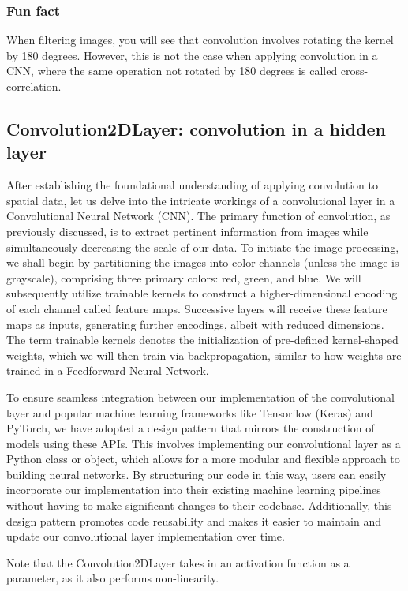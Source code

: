 \documentclass[onecolumn,10pt,cleanfoot]{asme2ej}
\begin{document}
\subsubsection{Fun fact}
When filtering images, you will see that convolution involves rotating the kernel by 180 degrees. However, this is not the case when applying convolution in a CNN, where the same operation not rotated by 180 degrees is called cross-correlation.

\subsection{Convolution2DLayer: convolution in a hidden layer}
After establishing the foundational understanding of applying convolution to spatial data, let us delve into the intricate workings of a convolutional layer in a Convolutional Neural Network (CNN). The primary function of convolution, as previously discussed, is to extract pertinent information from images while simultaneously decreasing the scale of our data. To initiate the image processing, we shall begin by partitioning the images into color channels (unless the image is grayscale), comprising three primary colors: red, green, and blue. We will subsequently utilize trainable kernels to construct a higher-dimensional encoding of each channel called feature maps. Successive layers will receive these feature maps as inputs, generating further encodings, albeit with reduced dimensions. The term trainable kernels denotes the initialization of pre-defined kernel-shaped weights, which we will then train via backpropagation, similar to how weights are trained in a Feedforward Neural Network.

To ensure seamless integration between our implementation of the convolutional layer and popular machine learning frameworks like Tensorflow (Keras) and PyTorch, we have adopted a design pattern that mirrors the construction of models using these APIs. This involves implementing our convolutional layer as a Python class or object, which allows for a more modular and flexible approach to building neural networks. By structuring our code in this way, users can easily incorporate our implementation into their existing machine learning pipelines without having to make significant changes to their codebase. Additionally, this design pattern promotes code reusability and makes it easier to maintain and update our convolutional layer implementation over time. 

Note that the Convolution2DLayer takes in an activation function as a parameter, as it also performs non-linearity.
\end{document}
